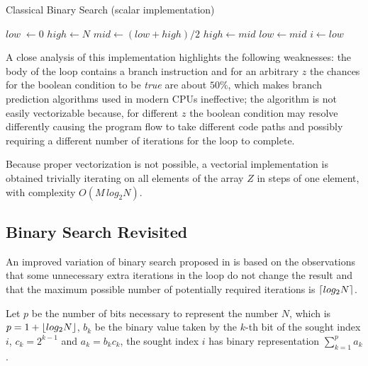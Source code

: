 \documentclass[preprint,1p,times]{elsarticle}
\begin{document}
\begin{algorithm}
\caption{Classical Binary Search (scalar implementation)}
\label{alg:naivealg}
\begin{algorithmic}
\State $low\; \leftarrow 0$
\State $high  \leftarrow N$
 
    \State $mid \leftarrow (low+high) / 2$
      
        \State $high \leftarrow mid$
    \Else
        \State $low \leftarrow mid$
    \EndIf
\EndWhile
\State $i \leftarrow low$
\EndFunction
\end{algorithmic}
\end{algorithm}

A close analysis of this implementation highlights the following weaknesses: 
    the body of the loop contains a branch instruction and for an arbitrary $z$ the chances for the boolean 
	condition to be \textit{true} are about $50\%$, which makes branch prediction algorithms used in modern CPUs ineffective; 
	the algorithm is not easily vectorizable because, for different $z$ the boolean condition may resolve differently 
    causing the program flow to take different code paths and possibly requiring a different number of iterations for the loop to complete.

Because proper vectorization is not possible, a vectorial implementation is obtained trivially iterating on all elements of the array $Z$ in steps of one element, with complexity $O(M\,log_2N)$.

\subsection{Binary Search Revisited}
\label{sec:optimbinary}

An improved variation of binary search proposed in \cite{Pulver2011} is based on the
observations that some unnecessary extra iterations in the loop do not change the result and 
that the maximum possible number of potentially required iterations is $\left \lceil log_2N \right \rceil$.

Let $p$ be the number of bits necessary to represent the number $N$, which is $p=1+\left \lfloor  log_2 N  \right \rfloor$,
    $b_k$ be the binary value taken by the $k$-th bit of the sought index $i$,
    $c_k = 2^{k-1}$
    and $a_k = b_kc_k$,
the sought index $i$ has binary representation $\sum_{k=1}^{p}a_k$.
\end{document}
